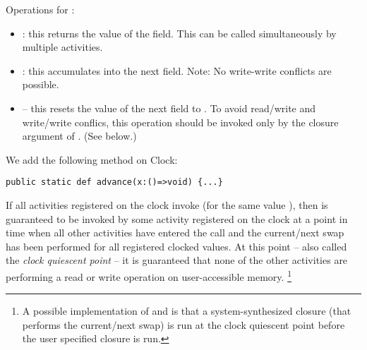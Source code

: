 Operations for :
\begin{itemize}
\item {}: this returns the value of the 
  field. This can be called simultaneously by multiple activities.
\item{}:  this accumulates  into the next field. Note: No
     write-write conflicts are possible.
\item{} -- this resets the value of the next field to . To avoid
     read/write and write/write conflics, this operation should be
     invoked only by the closure argument of
     . (See below.)
\end{itemize}

We add the following method on Clock:
\begin{lstlisting}
public static def advance(x:()=>void) {...}
\end{lstlisting}

If all activities registered on the clock invoke 
(for the same value ), then  is guaranteed to be
invoked by some activity  registered on the clock at a point in time
when all other activities have entered the  call
and the current/next swap has been performed for all registered
clocked values.  At this point -- also called the {\em clock quiescent
point} -- it is guaranteed that none of the other activities are
performing a read or write operation on user-accessible memory.
\footnote{
A possible implementation of  and
 is that a system-synthesized closure (that
performs the current/next swap) is run at the clock quiescent point
before the user specified closure is run.}
